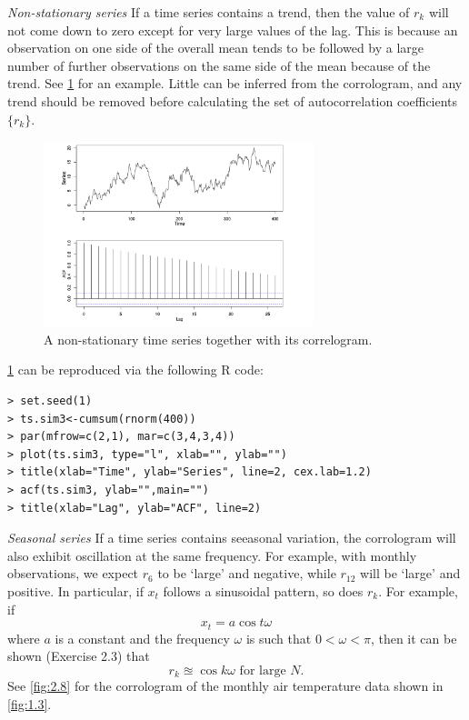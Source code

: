 \textit{Non-stationary series}
If a time series contains a trend, then the value of $r_k$ will not come down to zero except for very large values of the lag. This is because an observation on one side of the overall mean tends to be followed by a large number of further observations on the same side of the mean because of the trend. See \cref{fig:2.7} for an example. Little can be inferred from the corrologram, and any trend should be removed before calculating the set of autocorrelation coefficients $\{ r_k \}$.

\begin{figure}[ht]
	\centering
	\includegraphics[width=0.7\textwidth]{Chapter 2/fig2-7.png}
	\caption{A non-stationary time series together with its correlogram.}
	\label{fig:2.7}
\end{figure}

\cref{fig:2.7} can be reproduced via the following R code:
\begin{verbatim}
> set.seed(1)
> ts.sim3<-cumsum(rnorm(400))
> par(mfrow=c(2,1), mar=c(3,4,3,4))
> plot(ts.sim3, type="l", xlab="", ylab="")
> title(xlab="Time", ylab="Series", line=2, cex.lab=1.2)
> acf(ts.sim3, ylab="",main="")
> title(xlab="Lag", ylab="ACF", line=2)
\end{verbatim}

\textit{Seasonal series}
If a time series contains seeasonal variation, the corrologram will also exhibit oscillation at the same frequency. For example, with monthly observations, we expect $r_6$ to be `large' and negative, while $r_12$ will be `large' and positive. In particular, if $x_t$ follows a sinusoidal pattern, so does $r_k$. For example, if 
\[ x_t = a \cos{t \omega} \]
where $a$ is a constant and the frequency $\omega$ is such that $0 < \omega < \pi$, then it can be shown (Exercise 2.3) that 
\[ r_k \approxeq \cos{k \omega} \text{ for large } N. \]
See \cref{fig:2.8} for the corrologram of the monthly air temperature data shown in \cref{fig:1.3}.

